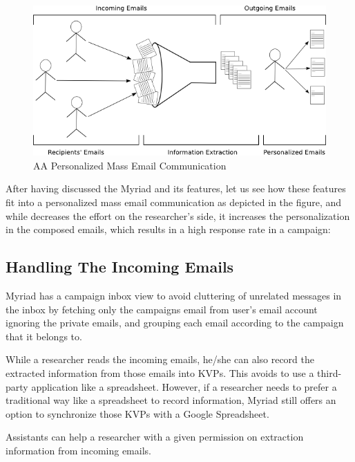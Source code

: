 \begin{figure}[htbp]
	\centering
	\includegraphics[width=1.00\textwidth]{imgs/drawingStatesOfEmailCommunication.png}
	\caption[A Personalized Mass Email Communication]{AA Personalized Mass Email Communication}
	\label{fig:drawingStatesOfEmailCommunication}
\end{figure}

After having discussed the Myriad and its features, let us see how these features fit into a personalized mass email communication as depicted in the figure, and while decreases the effort on the researcher's side, it increases the personalization in the composed emails, which results in a high response rate in a campaign:

\subsection{Handling The Incoming Emails}
\label{subsec:5.4.1:IncoEmai}

Myriad has a campaign inbox view to avoid cluttering of unrelated messages  in the inbox by fetching only the campaigns email from user's email account ignoring the private emails, and grouping each email according to the campaign that it belongs to.
\vspace{1cm}

While a researcher reads the incoming emails, he/she can also record the extracted information from those emails into \ac{KVP}s. This avoids to use a third-party application like a spreadsheet. However, if a researcher needs to prefer a traditional way like a spreadsheet to record information, Myriad still offers an option to synchronize those \ac{KVP}s with a Google Spreadsheet.
\vspace{1cm}

Assistants can help a researcher with a given permission on extraction information from incoming emails.


